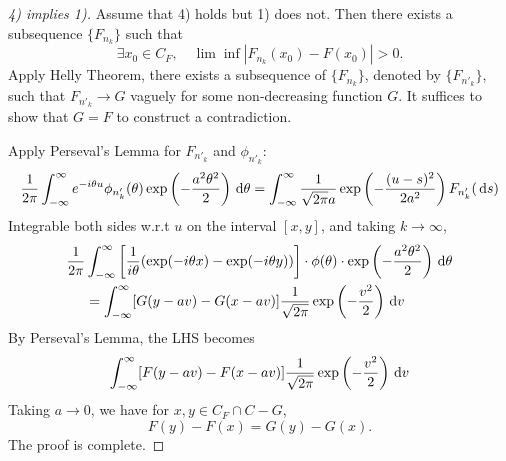 \begin{proof}[4) implies 1)]
Assume that 4) holds but 1) does not.
Then there exists a subsequence $\{F_{n_k}\}$ such that 
\[
\exists x_0\in C_F,\quad 
\lim\inf|F_{n_k}(x_0) - F(x_0)|>0.
\]
Apply Helly Theorem, there exists a subsequence of $\{F_{n_k}\}$, denoted by $\{F_{n'_k}\}$, such that $F_{n'_k}\to G$ vaguely for some non-decreasing function $G$.
It suffices to show that $G=F$ to construct a contradiction.

Apply Perseval's Lemma for $F_{n'_k}$ and $\phi_{n'_k}$:
\begin{equation}
\frac{1}{2\pi}\int_{-\infty}^\infty e^{-i\theta u}\phi_{n'_k}(\theta)\exp\left(-\frac{a^2\theta^2}{2}\right)\,\mathrm{d}\theta
=
\int_{-\infty}^\infty \frac{1}{\sqrt{2\pi} a}\exp\left(-\frac{(u-s)^2}{2a^2}\right)F_{n'_k}(\,\mathrm{d} s)
\end{equation}
Integrable both sides w.r.t $u$ on the interval $[x,y]$, and taking $k\to\infty$,
\begin{align*}
\frac{1}{2\pi}&\int_{-\infty}^\infty \left[\frac{1}{i\theta}(\exp(-i\theta x) - \exp(-i\theta y))\right]\cdot
\phi(\theta)\cdot\exp\left(-\frac{a^2\theta^2}{2}\right)\,\mathrm{d}\theta
\\&=
\int_{-\infty}^\infty[G(y-av) - G(x-av)]\frac{1}{\sqrt{2\pi}}\exp\left(-\frac{v^2}{2}\right)\,\mathrm{d} v
\end{align*}
By Perseval's Lemma, the LHS becomes
\[
\int_{-\infty}^\infty[F(y-av) - F(x-av)]\frac{1}{\sqrt{2\pi}}\exp\left(-\frac{v^2}{2}\right)\,\mathrm{d} v
\]
Taking $a\to0$, we have for $x,y\in C_F\cap C-G$,
\[
F(y)-F(x) = G(y) - G(x).
\]
The proof is complete.
\end{proof}












